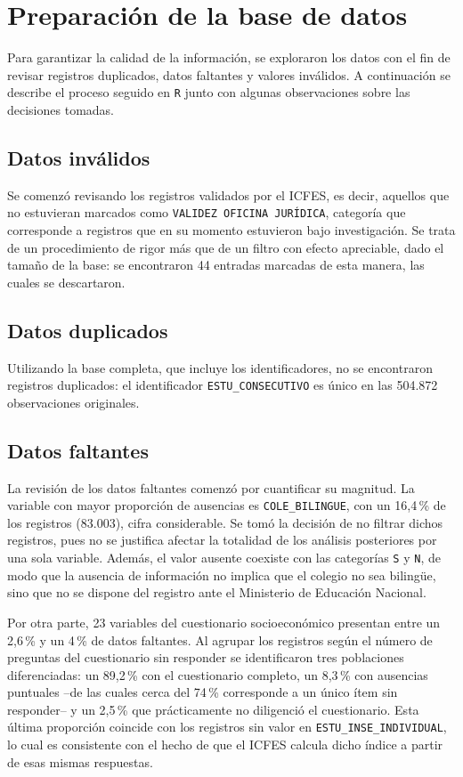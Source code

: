 \documentclass[12pt]{article}
\begin{document}
\section{Preparación de la base de datos}
Para garantizar la calidad de la información, se exploraron los datos con el fin de revisar registros duplicados, datos faltantes y valores inválidos. A continuación se describe el proceso seguido en \texttt{R} junto con algunas observaciones sobre las decisiones tomadas.

\subsection{Datos inválidos}
Se comenzó revisando los registros validados por el ICFES, es decir, aquellos que no estuvieran marcados como \texttt{VALIDEZ OFICINA JURÍDICA}, categoría que corresponde a registros que en su momento estuvieron bajo investigación. Se trata de un procedimiento de rigor más que de un filtro con efecto apreciable, dado el tamaño de la base: se encontraron 44 entradas marcadas de esta manera, las cuales se descartaron.

\subsection{Datos duplicados}
Utilizando la base completa, que incluye los identificadores, no se encontraron registros duplicados: el identificador \texttt{ESTU\_CONSECUTIVO} es único en las 504.872 observaciones originales.

\subsection{Datos faltantes}
La revisión de los datos faltantes comenzó por cuantificar su magnitud. La variable con mayor proporción de ausencias es \texttt{COLE\_BILINGUE}, con un 16,4\,\% de los registros (83.003), cifra considerable. Se tomó la decisión de no filtrar dichos registros, pues no se justifica afectar la totalidad de los análisis posteriores por una sola variable. Además, el valor ausente coexiste con las categorías \texttt{S} y \texttt{N}, de modo que la ausencia de información no implica que el colegio no sea bilingüe, sino que no se dispone del registro ante el Ministerio de Educación Nacional.

Por otra parte, 23 variables del cuestionario socioeconómico presentan entre un 2,6\,\% y un 4\,\% de datos faltantes. Al agrupar los registros según el número de preguntas del cuestionario sin responder se identificaron tres poblaciones diferenciadas: un 89,2\,\% con el cuestionario completo, un 8,3\,\% con ausencias puntuales --de las cuales cerca del 74\,\% corresponde a un único ítem sin responder-- y un 2,5\,\% que prácticamente no diligenció el cuestionario. Esta última proporción coincide con los registros sin valor en \texttt{ESTU\_INSE\_INDIVIDUAL}, lo cual es consistente con el hecho de que el ICFES calcula dicho índice a partir de esas mismas respuestas.
\end{document}
